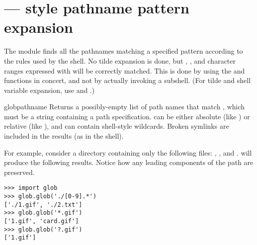 \section{ ---
         \UNIX{} style pathname pattern expansion}



The  module finds all the pathnames matching a specified
pattern according to the rules used by the \UNIX{} shell.  No tilde
expansion is done, but \code{*}, , and character ranges
expressed with \code{[]} will be correctly matched.  This is done by
using the  and 
functions in concert, and not by actually invoking a subshell.  (For
tilde and shell variable expansion, use 
and .)

\begin{funcdesc}{glob}{pathname}
Returns a possibly-empty list of path names that match ,
which must be a string containing a path specification.
 can be either absolute (like
) or relative (like
), and can contain shell-style wildcards.
Broken symlinks are included in the results (as in the shell).
\end{funcdesc}

For example, consider a directory containing only the following files:
, , and .  
will produce the following results.  Notice how any leading components
of the path are preserved.

\begin{verbatim}
>>> import glob
>>> glob.glob('./[0-9].*')
['./1.gif', './2.txt']
>>> glob.glob('*.gif')
['1.gif', 'card.gif']
>>> glob.glob('?.gif')
['1.gif']
\end{verbatim}


\begin{seealso}
\end{seealso}
